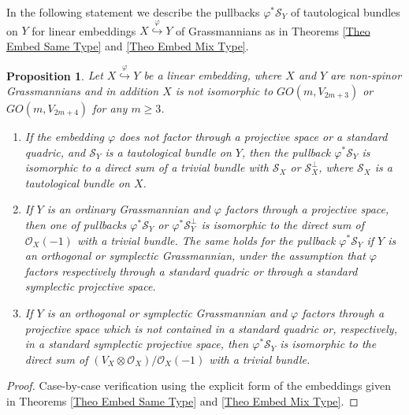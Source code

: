 \documentclass[12pt]{amsart}
\def\hw  {\hookrightarrow}
\def\mc {\mathcal}
\newtheorem{prop}[theorem]{Proposition}
\begin{document}
In the following statement we describe the pullbacks $\varphi^*\mc S_Y$ of tautological bundles on $Y$ for linear embeddings $X\stackrel{\varphi}{\hw} Y$ of Grassmannians as in Theorems \ref{Theo Embed Same Type} and \ref{Theo Embed Mix Type}.


\begin{prop}\label{Prop Subbund to lin emb}
Let $X\stackrel{\varphi}{\hw} Y$ be a linear embedding, where $X$ and $Y$ are non-spinor Grassmannians and in addition $X$ is not isomorphic to $GO(m,V_{2m+3})$ or $GO(m,V_{2m+4})$ for any $m\geq 3$.
\begin{enumerate}
\item[{\rm (i)}] If the embedding $\varphi$ does not factor through a projective space or a standard quadric, and $\mc S_Y$ is a tautological bundle on $Y$, then the pullback $\varphi^*\mc S_Y$ is isomorphic to a direct sum of a trivial bundle with $\mc S_X$ or $\mc S_X^\perp$, where $\mc S_X$ is a tautological bundle on $X$.
\item[{\rm (ii)}] If $Y$ is an ordinary Grassmannian and $\varphi$ factors through a projective space, then one of pullbacks $\varphi^*\mc S_Y$ or $\varphi^* \mc S_Y^\perp$ is isomorphic to the direct sum of $\mc O_X(-1)$ with a trivial bundle. The same holds for the pullback $\varphi^*\mc S_Y$ if $Y$ is an orthogonal or symplectic Grassmannian, under the assumption that $\varphi$ factors respectively through a standard quadric or through a standard symplectic projective space.
\item[{\rm (iii)}] If $Y$ is an orthogonal or symplectic Grassmannian and $\varphi$ factors through a projective space which is not contained in a standard quadric or, respectively, in a standard symplectic projective space, then $\varphi^*\mc S_Y$ is isomorphic to the direct sum of $(V_X\otimes \mc O_X)/\mc O_X(-1)$ with a trivial bundle.
\end{enumerate}
\end{prop}

\begin{proof}
Case-by-case verification using the explicit form of the embeddings given in Theorems \ref{Theo Embed Same Type} and \ref{Theo Embed Mix Type}.
\end{proof}
\end{document}
